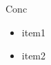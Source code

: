 

% 




      \justifying
      {\rmfamily
      Conc
        \begin{itemize}
          \item item1
          \item item2
        \end{itemize}
}
      
